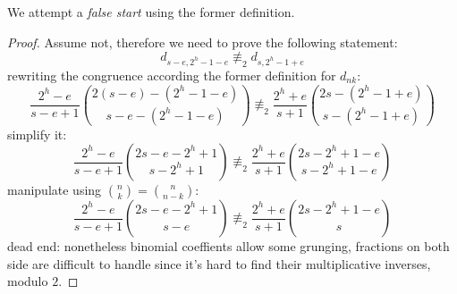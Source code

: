 \documentclass[11pt,a4paper]{article} %
\begin{document}
    We attempt a \emph{false start} using the former definition.
    \begin{proof}
    Assume not, therefore we need to prove the following statement:
    \begin{displaymath}
        d_{s-e,2^{h}-1-e} \not\equiv_{2} d_{s,2^{h}-1+e}
    \end{displaymath}
    rewriting the congruence according the former definition for $d_{nk}$:
    \begin{displaymath}
        \frac{2^{h}-e}{s-e+1}{{2(s-e)-(2^{h}-1-e)}\choose{s-e-(2^{h}-1-e)}}
        \not\equiv_{2}
        \frac{2^{h}+e}{s+1}{{2s-(2^{h}-1+e)}\choose{s-(2^{h}-1+e)}}
    \end{displaymath}
    simplify it:
    \begin{displaymath}
        \frac{2^{h}-e}{s-e+1}{{2s-e-2^{h}+1}\choose{s-2^{h}+1}}
        \not\equiv_{2}
        \frac{2^{h}+e}{s+1}{{2s-2^{h}+1-e}\choose{s-2^{h}+1-e}}
    \end{displaymath}
    manipulate using ${{n}\choose{k}}={{n}\choose{n-k}}$:
    \begin{displaymath}
        \frac{2^{h}-e}{s-e+1}{{2s-e-2^{h}+1}\choose{s-e}}
        \not\equiv_{2}
        \frac{2^{h}+e}{s+1}{{2s-2^{h}+1-e}\choose{s}}
    \end{displaymath}
    dead end: nonetheless binomial coeffients allow some grunging,
    fractions on both side are difficult to handle since it's hard
    to find their multiplicative inverses, modulo $2$.
    \end{proof} 
    
\end{document}
